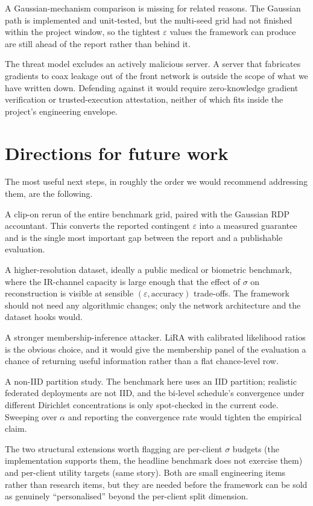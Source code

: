 \documentclass[11pt,a4paper,oneside]{report}
\begin{document}
A Gaussian-mechanism comparison is missing for related reasons. The
Gaussian path is implemented and unit-tested, but the multi-seed
grid had not finished within the project window, so the tightest
$\varepsilon$ values the framework can produce are still ahead of
the report rather than behind it.

The threat model excludes an actively malicious server. A server
that fabricates gradients to coax leakage out of the front network
is outside the scope of what we have written down. Defending against
it would require zero-knowledge gradient verification or
trusted-execution attestation, neither of which fits inside the
project's engineering envelope.

\section{Directions for future work}

The most useful next steps, in roughly the order we would recommend
addressing them, are the following.

A clip-on rerun of the entire benchmark grid, paired with the
Gaussian RDP accountant. This converts the reported contingent
$\varepsilon$ into a measured guarantee and is the single most
important gap between the report and a publishable evaluation.

A higher-resolution dataset, ideally a public medical or biometric
benchmark, where the IR-channel capacity is large enough that the
effect of $\sigma$ on reconstruction is visible at sensible
$(\varepsilon, \text{accuracy})$ trade-offs. The framework should
not need any algorithmic changes; only the network architecture and
the dataset hooks would.

A stronger membership-inference attacker. LiRA with calibrated
likelihood ratios is the obvious choice, and it would give the
membership panel of the evaluation a chance of returning useful
information rather than a flat chance-level row.

A non-IID partition study. The benchmark here uses an IID partition;
realistic federated deployments are not IID, and the bi-level
schedule's convergence under different Dirichlet concentrations is
only spot-checked in the current code. Sweeping over $\alpha$ and
reporting the convergence rate would tighten the empirical claim.

The two structural extensions worth flagging are per-client
$\sigma$ budgets (the implementation supports them, the headline
benchmark does not exercise them) and per-client utility targets
(same story). Both are small engineering items rather than research
items, but they are needed before the framework can be sold as
genuinely ``personalised'' beyond the per-client split dimension.
\end{document}
